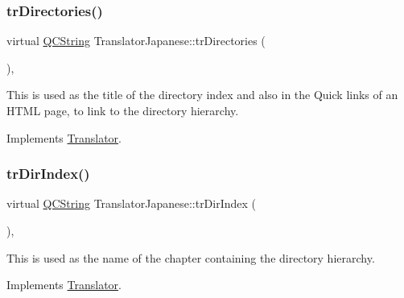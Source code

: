 \mbox{\label{class_translator_japanese_a060115ae997a9bc3bbc7191d0dddbaea}} 
\subsubsection{\texorpdfstring{trDirectories()}{trDirectories()}}
{\footnotesize\ttfamily virtual \mbox{\hyperlink{class_q_c_string}{Q\+C\+String}} Translator\+Japanese\+::tr\+Directories (\begin{DoxyParamCaption}{ }\end{DoxyParamCaption})\hspace{0.3cm}{\ttfamily [inline]}, {\ttfamily [virtual]}}

This is used as the title of the directory index and also in the Quick links of an H\+T\+ML page, to link to the directory hierarchy. 

Implements \mbox{\hyperlink{class_translator}{Translator}}.

\mbox{\label{class_translator_japanese_a027c07f499a03ce03ad158c869115472}} 
\subsubsection{\texorpdfstring{trDirIndex()}{trDirIndex()}}
{\footnotesize\ttfamily virtual \mbox{\hyperlink{class_q_c_string}{Q\+C\+String}} Translator\+Japanese\+::tr\+Dir\+Index (\begin{DoxyParamCaption}{ }\end{DoxyParamCaption})\hspace{0.3cm}{\ttfamily [inline]}, {\ttfamily [virtual]}}

This is used as the name of the chapter containing the directory hierarchy. 

Implements \mbox{\hyperlink{class_translator}{Translator}}.

\mbox{\label{class_translator_japanese_a41232a3dc6ce64ac8552cf18e4e26977}} 
